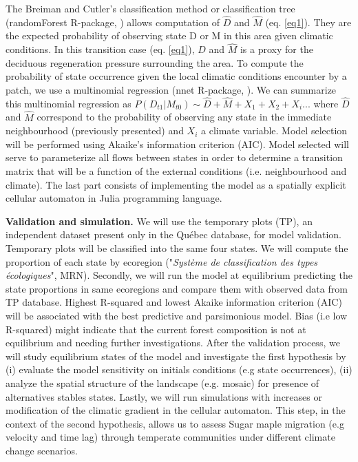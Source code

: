 The Breiman and Cutler's classification method or classification tree
(randomForest R-package, \cite{Liaw2002a}) allows computation of $\hat{D}$ and
$\hat{M}$ (eq. \ref{eq1}). They are the expected probability of observing
state D or M in this area given climatic conditions. In this transition case
(eq. \ref{eq1}), $\hat{D}$ and $\hat{M}$ is a proxy for the deciduous
regeneration pressure surrounding the area. To compute the probability of
state occurrence given the local climatic conditions encounter by a patch, we
use a multinomial regression (nnet R-package, \cite{Venables2002}). We can
summarize this multinomial regression as $P(D_{t1}|M_{t0}) \sim \hat{D} +
\hat{M} + X_1+X_2+X_i... $ where $\hat{D}$ and $\hat{M}$ correspond to the
probability of observing any state in the immediate neighbourhood (previously
presented) and $X_i$ a climate variable. Model selection will be performed
using Akaike's information criterion (AIC). Model selected will serve to
parameterize all flows between states in order to determine a transition
matrix that will be a function of the external conditions (i.e. neighbourhood
and climate). The last part consists of implementing the model as a spatially
explicit cellular automaton in Julia programming language.





\textbf{Validation and simulation.} We will use the temporary plots (TP), an
independent dataset present only in the Québec database, for model
validation. Temporary plots will be classified into the same four states. We
will compute the proportion of each state by ecoregion ("\textit{Système de
classification des types écologiques}", MRN). Secondly, we will run the model
at equilibrium predicting the state proportions in same ecoregions and compare
them with observed data from TP database. Highest R-squared and lowest Akaike
information criterion (AIC) will be associated with the best predictive and
parsimonious model. Bias (i.e low R-squared) might indicate that the current
forest composition is not at equilibrium and needing further investigations.
After the validation process, we will study equilibrium states of the model
and investigate the first hypothesis by (i) evaluate the model sensitivity on
initials conditions (e.g state occurrences), (ii) analyze the spatial
structure of the landscape (e.g. mosaic) for presence of alternatives stables
states. Lastly, we will run simulations with increases or modification of the
climatic gradient in the cellular automaton. This step, in the context of the
second hypothesis, allows us to assess Sugar maple migration (e.g velocity and
time lag) through temperate communities under different climate change
scenarios.


\clearpage
\small

